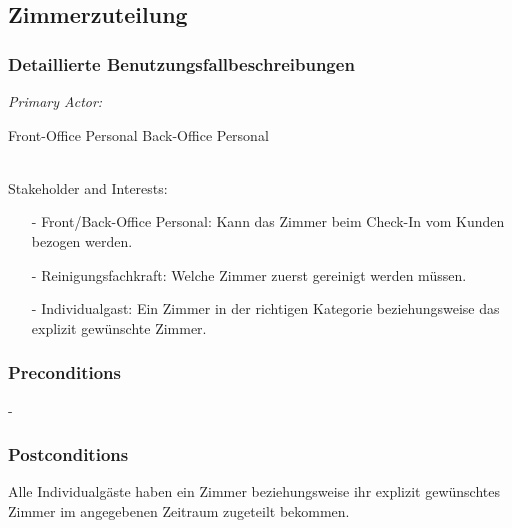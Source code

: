 \documentclass[./detailed_overview_usecases.tex]{subfiles}
\begin{document}
    \subsection{Zimmerzuteilung}
    \subsubsection{Detaillierte Benutzungsfallbeschreibungen}
    \textit{Primary Actor:}
    \begin{enumerate}
        Front-Office Personal
        Back-Office Personal
    \end{enumerate}
    \\
    Stakeholder and Interests:
    \begin{itemize}
        \item[-] Front/Back-Office Personal: Kann das Zimmer beim Check-In vom Kunden bezogen werden.
        \item[-] Reinigungsfachkraft: Welche Zimmer zuerst gereinigt werden müssen.
        \item[-] Individualgast: Ein Zimmer in der richtigen Kategorie beziehungsweise das explizit gewünschte Zimmer.
    \end{itemize}

    \subsubsection*{Preconditions}
    -
    \subsubsection*{Postconditions}
    Alle Individualgäste haben ein Zimmer beziehungsweise ihr explizit gewünschtes Zimmer im angegebenen Zeitraum zugeteilt bekommen.
\end{document}
